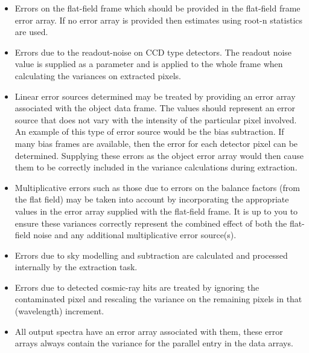 \begin{itemize}

\item Errors on the flat-field frame which should be provided in the
      flat-field frame error array.  If no error array is provided then
      estimates using root-n statistics are used.

\item Errors due to the readout-noise on CCD type detectors. The
      readout noise value is supplied as a parameter and is applied to the
      whole frame when calculating the variances on extracted pixels.

\item Linear error sources determined may be treated by
      providing an error array associated with the object data frame. The
      values should represent an error source that does not vary with the
      intensity of the particular pixel involved. An example of this type
      of error source would be the bias subtraction. If many bias frames
      are available, then the error  for each detector pixel can be
      determined.
      Supplying these errors as the object error array
      would then cause them to be correctly included in the variance
      calculations during extraction.

\item Multiplicative errors such as those due to errors on the balance
      factors (from the flat field) may be taken into account by
      incorporating the appropriate values in the error array supplied with
      the flat-field frame. It is up to you to ensure these variances
      correctly represent the combined effect of both the flat-field noise
      and any additional multiplicative error source(s).

\item Errors due to sky modelling and subtraction are calculated and
      processed internally by the extraction task.

\item Errors due to detected cosmic-ray hits are treated by ignoring the
      contaminated pixel and rescaling the variance on the remaining pixels
      in that (wavelength) increment.

\item All output spectra have an error array associated with them, these
      error arrays always contain the variance for the parallel entry in
      the data arrays.

\end{itemize}


